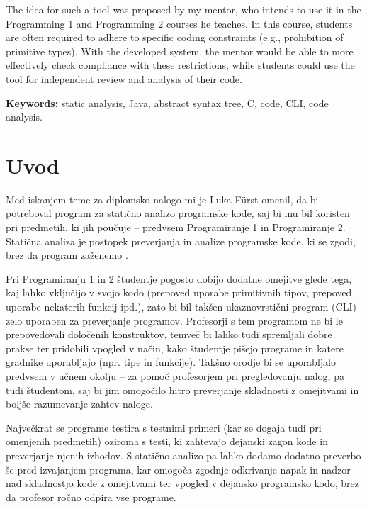 \documentclass[a4paper,12pt,openright]{book}
\newcommand{\tkeywordsEn}{static analysis, Java, abstract syntax tree, C, code, CLI, code analysis}
\newcommand{\clearemptydoublepage}{\newpage{\pagestyle{empty}\cleardoublepage}}
\begin{document}
The idea for such a tool was proposed by my mentor, who intends to use it in the Programming 1 and Programming 2 courses he teaches. In this course, students are often required to adhere to specific coding constraints (e.g., prohibition of primitive types). With the developed system, the mentor would be able to more effectively check compliance with these restrictions, while students could use the tool for independent review and analysis of their code.
\bigskip

\noindent\textbf{Keywords:} \tkeywordsEn.
\clearemptydoublepage

\mainmatter
\setcounter{page}{1}
\pagestyle{fancy}

\chapter{Uvod}

Med iskanjem teme za diplomsko nalogo mi je Luka Fürst omenil, da bi potreboval program za statično analizo programske kode, saj bi mu bil koristen pri predmetih, ki jih poučuje – predvsem Programiranje 1 in Programiranje 2. Statična analiza je postopek preverjanja in analize programske kode, ki se zgodi, brez da program zaženemo \cite{techtarget_static}. 

Pri Programiranju 1 in 2 študentje pogosto dobijo dodatne omejitve glede tega, kaj lahko vključijo v svojo kodo (prepoved uporabe primitivnih tipov, prepoved uporabe nekaterih funkcij ipd.), zato bi bil takšen ukaznovrstični program (CLI) zelo uporaben za preverjanje programov. Profesorji s tem programom ne bi le prepovedovali določenih konstruktov, temveč bi lahko tudi spremljali dobre prakse ter pridobili vpogled v način, kako študentje pišejo programe in katere gradnike uporabljajo (npr. tipe in funkcije). Takšno orodje bi se uporabljalo predvsem v učnem okolju – za pomoč profesorjem pri pregledovanju nalog, pa tudi študentom, saj bi jim omogočilo hitro preverjanje skladnosti z omejitvami in boljše razumevanje zahtev naloge.

Največkrat se programe testira s testnimi primeri (kar se dogaja tudi pri omenjenih predmetih) oziroma s testi, ki zahtevajo dejanski zagon kode in preverjanje njenih izhodov. S statično analizo pa lahko dodamo dodatno preverbo še pred izvajanjem programa, kar omogoča zgodnje odkrivanje napak in nadzor nad skladnostjo kode z omejitvami ter vpogled v dejansko programsko kodo, brez da profesor ročno odpira vse programe.
\end{document}

